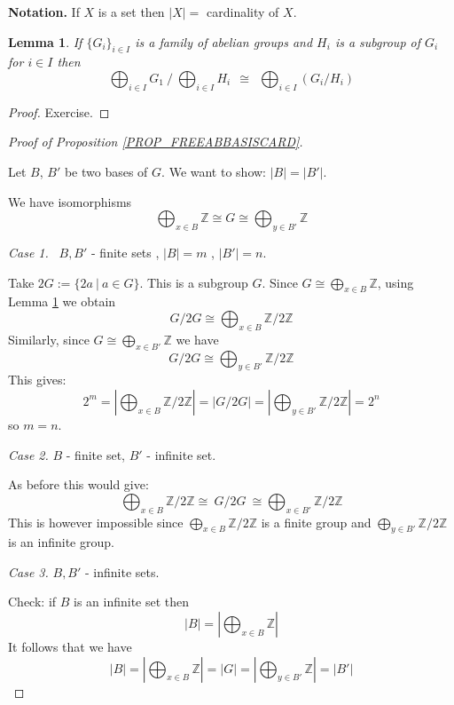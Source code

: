 \documentclass[12pt, letterpaper, oneside]{article}
\theoremstyle{plain}
\newtheorem{lemma}[theorem]{Lemma}
\theoremstyle{definition}
\newcommand{\Z}{{\mathbb Z}}
\newcommand{\vs}{\vskip 5mm}
\begin{document}
\textbf{Notation.} If $X$ is a set then $|X| = $ cardinality of $X$.

\vs 


\begin{lemma}
\label{LEMMA_FREEABBASIS}
If $\{G_{i}\}_{i\in I}$ is a family of abelian groups and $H_{i}$ is a subgroup of $G_{i}$ for $i\in I$ 
then 
$$\bigoplus_{i\in I} G_{1}\ /\ \bigoplus_{i\in I} H_{i}\  \ \cong \ \ \bigoplus_{i\in I}(G_{i}/H_{i})$$
\end{lemma}

\begin{proof}
Exercise. 
\end{proof}

\vs
\begin{proof}[Proof of Proposition \ref{PROP_FREEABBASISCARD}] \ 
 
 Let $B$, $B'$ be two bases of $G$.  We want to show: $|B|= |B'|$.
   
 We have isomorphisms
 $$\bigoplus_{x\in B} \Z \cong G \cong \bigoplus_{y\in B'} \Z$$
 
 
\emph{Case 1.} \ $B, B'$ - finite sets , $|B| =m$ , $|B'|= n$. 


Take 
$2G  := \{ 2a \ | \ a\in G \}$. This is a subgroup $G$. Since $G\cong\bigoplus_{x\in B}\Z$, 
using Lemma \ref{LEMMA_FREEABBASIS} we obtain
\begin{equation*}
\label{EQ_FREEABBASIS1}
G/2G \cong \bigoplus_{x\in B} \Z/2\Z 
\end{equation*} 
Similarly, since $G\cong\bigoplus_{x\in B'}\Z$ we have
\begin{equation*}
\label{EQ_FREEABBASIS2}
G/2G \cong \bigoplus_{y\in B'} \Z/2\Z 
\end{equation*} 
This gives:
$$2^{m} = |\bigoplus_{x\in B} \Z/2\Z| = |G/2G| =  |\bigoplus_{y\in B'} \Z/2\Z| =2^{n}$$
so $m=n$.

\emph{Case 2.} $B$ - finite set, $B'$ - infinite set. 

As before this would give:
$$ \bigoplus_{x\in B} \Z/2\Z \cong\  G/2G \  \cong \bigoplus_{x\in B'} \Z/2\Z $$ 
This is however impossible since $\bigoplus_{x\in B} \Z/2\Z$ is a finite group 
and $\bigoplus_{y\in B'} \Z/2\Z $ is an infinite group. 


\emph{Case 3.} $B, B'$ - infinite sets.

Check: if $B$ is an infinite set then 
$$|B| = |\bigoplus_{x\in B}\Z|$$
It follows that we have
$$|B|  = |\bigoplus_{x\in B}\Z| = |G| = |\bigoplus_{y\in B'}\Z|  = |B'|$$
\end{proof}
\end{document}
